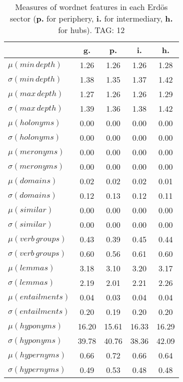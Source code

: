 \begin{table}[h!]
\begin{center}
\begin{tabular}{| l | c | c | c | c |}\hline
 & g. & p. & i. & h. \\\hline
$\mu(min\,depth)$ & 1.26  & 1.26  & 1.26  & 1.28 \\\hline
$\sigma(min\,depth)$ & 1.38  & 1.35  & 1.37  & 1.42 \\\hline
$\mu(max\,depth)$ & 1.27  & 1.26  & 1.26  & 1.29 \\\hline
$\sigma(max\,depth)$ & 1.39  & 1.36  & 1.38  & 1.42 \\\hline
$\mu(holonyms)$ & 0.00  & 0.00  & 0.00  & 0.00 \\\hline
$\sigma(holonyms)$ & 0.00  & 0.00  & 0.00  & 0.00 \\\hline
$\mu(meronyms)$ & 0.00  & 0.00  & 0.00  & 0.00 \\\hline
$\sigma(meronyms)$ & 0.00  & 0.00  & 0.00  & 0.00 \\\hline
$\mu(domains)$ & 0.02  & 0.02  & 0.02  & 0.01 \\\hline
$\sigma(domains)$ & 0.12  & 0.13  & 0.12  & 0.11 \\\hline
$\mu(similar)$ & 0.00  & 0.00  & 0.00  & 0.00 \\\hline
$\sigma(similar)$ & 0.00  & 0.00  & 0.00  & 0.00 \\\hline
$\mu(verb\,groups)$ & 0.43  & 0.39  & 0.45  & 0.44 \\\hline
$\sigma(verb\,groups)$ & 0.60  & 0.56  & 0.61  & 0.60 \\\hline
$\mu(lemmas)$ & 3.18  & 3.10  & 3.20  & 3.17 \\\hline
$\sigma(lemmas)$ & 2.19  & 2.01  & 2.21  & 2.26 \\\hline
$\mu(entailments)$ & 0.04  & 0.03  & 0.04  & 0.04 \\\hline
$\sigma(entailments)$ & 0.20  & 0.19  & 0.20  & 0.20 \\\hline
$\mu(hyponyms)$ & 16.20  & 15.61  & 16.33  & 16.29 \\\hline
$\sigma(hyponyms)$ & 39.78  & 40.76  & 38.36  & 42.09 \\\hline
$\mu(hypernyms)$ & 0.66  & 0.72  & 0.66  & 0.64 \\\hline
$\sigma(hypernyms)$ & 0.49  & 0.53  & 0.48  & 0.48 \\\hline
\end{tabular}
\caption{Measures of wordnet features in each Erd\"os sector ({{\bf p.}} for periphery, {{\bf i.}} for intermediary, {{\bf h.}} for hubs). TAG: 12}
\end{center}
\end{table}